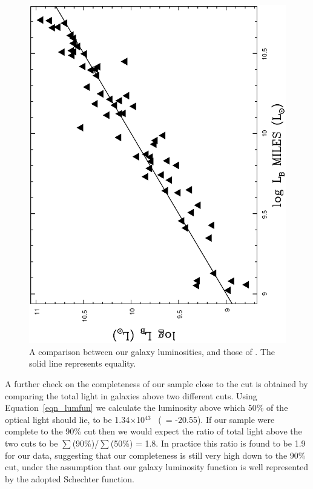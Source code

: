 \documentclass[usenatbib]{mn2e}
\begin{document}
\begin{figure}
  \includegraphics[height=\linewidth,angle=270]{fig_01.ps}
  \caption{A comparison between our galaxy luminosities, and those of
           \citet{miles04}.  The solid line represents equality.}
  \label{fig_LB_LBMILES}
\end{figure}

A further check on the completeness of our sample close to the cut is obtained by
comparing the total light in galaxies above two different cuts.  Using
Equation~\ref{eqn_lumfun} we calculate the luminosity above which 50\% of the
optical light should lie, to be 1.34$\times$10$^{43}$ \ergps\ (\MB\ = -20.55). If
our sample were complete to the 90\% cut then we would expect the ratio of total
light above the two cuts to be $\sum$\LB(90\%)/$\sum$\LB(50\%) = 1.8.  In
practice this ratio is found to be 1.9 for our data, suggesting that our
completeness is still very high down to the 90\% cut, under the assumption that
our galaxy luminosity function is well represented by the adopted Schechter
function.
\end{document}
